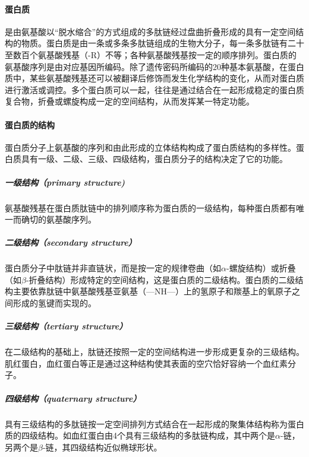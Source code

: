 \documentclass[12pt,a4paper]{article}
\begin{document}
\paragraph{蛋白质} 是由氨基酸以“脱水缩合”的方式组成的多肽链经过盘曲折叠形成的具有一定空间结构的物质。蛋白质是由一条或多条多肽链组成的生物大分子，每一条多肽链有二十至数百个氨基酸残基（-R）不等；各种氨基酸残基按一定的顺序排列。蛋白质的氨基酸序列是由对应基因所编码。除了遗传密码所编码的20种基本氨基酸，在蛋白质中，某些氨基酸残基还可以被翻译后修饰而发生化学结构的变化，从而对蛋白质进行激活或调控。多个蛋白质可以一起，往往是通过结合在一起形成稳定的蛋白质复合物，折叠或螺旋构成一定的空间结构，从而发挥某一特定功能。


\paragraph{蛋白质的结构} 蛋白质分子上氨基酸的序列和由此形成的立体结构构成了蛋白质结构的多样性。蛋白质具有一级、二级、三级、四级结构，蛋白质分子的结构决定了它的功能。
\subparagraph{一级结构（primary structure)} 氨基酸残基在蛋白质肽链中的排列顺序称为蛋白质的一级结构，每种蛋白质都有唯一而确切的氨基酸序列。
\subparagraph{二级结构（secondary structure）} 蛋白质分子中肽链并非直链状，而是按一定的规律卷曲（如$\alpha$-螺旋结构）或折叠（如$\beta$-折叠结构）形成特定的空间结构，这是蛋白质的二级结构。蛋白质的二级结构主要依靠肽链中氨基酸残基亚氨基（—NH—）上的氢原子和羰基上的氧原子之间形成的氢键而实现的。
\subparagraph{三级结构（tertiary structure）} 在二级结构的基础上，肽链还按照一定的空间结构进一步形成更复杂的三级结构。肌红蛋白，血红蛋白等正是通过这种结构使其表面的空穴恰好容纳一个血红素分子。
\subparagraph{四级结构（quaternary structure）} 具有三级结构的多肽链按一定空间排列方式结合在一起形成的聚集体结构称为蛋白质的四级结构。如血红蛋白由4个具有三级结构的多肽链构成，其中两个是$\alpha$-链，另两个是$\beta$-链，其四级结构近似椭球形状。

















\end{document}
